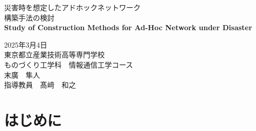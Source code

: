 \documentclass[a4paper, 11pt]{ltjsarticle}
\begin{document}
\fontsize{11pt}{14pt}\selectfont

\thispagestyle{empty}
\begin{center}

\vspace*{40mm}
{\huge\noindent 災害時を想定したアドホックネットワーク}\\
\medskip
{\huge\noindent 構築手法の検討}\\
\vspace{\baselineskip}
{\huge\noindent\textbf{Study of Construction Methods for Ad-Hoc Network under Disaster}}\\
\vspace{120mm}

{\huge\noindent
2025年3月4日\\
東京都立産業技術高等専門学校\\
ものづくり工学科　情報通信工学コース \\
末廣　隼人\\
指導教員　髙﨑　和之    \\
}
\vspace{40mm}

\end{center}

\clearpage  %
\thispagestyle{empty}
\tableofcontents  %

\clearpage
{}
\section{はじめに}

\end{document}
